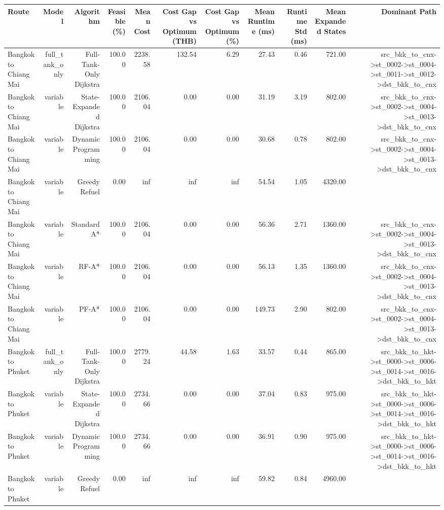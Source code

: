 \begin{tabular}{lrrrrrrrrrr}
\hline
Route & Model & Algorithm & Feasible (\%) & Mean Cost & Cost Gap vs Optimum (THB) & Cost Gap vs Optimum (\%) & Mean Runtime (ms) & Runtime Std (ms) & Mean Expanded States & Dominant Path \\
\hline
Bangkok to Chiang Mai & full\_tank\_only & Full-Tank-Only Dijkstra & 100.00 & 2238.58 & 132.54 & 6.29 & 27.43 & 0.46 & 721.00 & src\_bkk\_to\_cnx->st\_0002->st\_0004->st\_0011->st\_0012->dst\_bkk\_to\_cnx \\
Bangkok to Chiang Mai & variable & State-Expanded Dijkstra & 100.00 & 2106.04 & 0.00 & 0.00 & 31.19 & 3.19 & 802.00 & src\_bkk\_to\_cnx->st\_0002->st\_0004->st\_0013->dst\_bkk\_to\_cnx \\
Bangkok to Chiang Mai & variable & Dynamic Programming & 100.00 & 2106.04 & 0.00 & 0.00 & 30.68 & 0.78 & 802.00 & src\_bkk\_to\_cnx->st\_0002->st\_0004->st\_0013->dst\_bkk\_to\_cnx \\
Bangkok to Chiang Mai & variable & Greedy Refuel & 0.00 & inf & inf & inf & 54.54 & 1.05 & 4320.00 &  \\
Bangkok to Chiang Mai & variable & Standard A* & 100.00 & 2106.04 & 0.00 & 0.00 & 56.36 & 2.71 & 1360.00 & src\_bkk\_to\_cnx->st\_0002->st\_0004->st\_0013->dst\_bkk\_to\_cnx \\
Bangkok to Chiang Mai & variable & RF-A* & 100.00 & 2106.04 & 0.00 & 0.00 & 56.13 & 1.35 & 1360.00 & src\_bkk\_to\_cnx->st\_0002->st\_0004->st\_0013->dst\_bkk\_to\_cnx \\
Bangkok to Chiang Mai & variable & PF-A* & 100.00 & 2106.04 & 0.00 & 0.00 & 149.73 & 2.90 & 802.00 & src\_bkk\_to\_cnx->st\_0002->st\_0004->st\_0013->dst\_bkk\_to\_cnx \\
Bangkok to Phuket & full\_tank\_only & Full-Tank-Only Dijkstra & 100.00 & 2779.24 & 44.58 & 1.63 & 33.57 & 0.44 & 865.00 & src\_bkk\_to\_hkt->st\_0000->st\_0006->st\_0014->st\_0016->dst\_bkk\_to\_hkt \\
Bangkok to Phuket & variable & State-Expanded Dijkstra & 100.00 & 2734.66 & 0.00 & 0.00 & 37.04 & 0.83 & 975.00 & src\_bkk\_to\_hkt->st\_0000->st\_0006->st\_0014->st\_0016->dst\_bkk\_to\_hkt \\
Bangkok to Phuket & variable & Dynamic Programming & 100.00 & 2734.66 & 0.00 & 0.00 & 36.91 & 0.90 & 975.00 & src\_bkk\_to\_hkt->st\_0000->st\_0006->st\_0014->st\_0016->dst\_bkk\_to\_hkt \\
Bangkok to Phuket & variable & Greedy Refuel & 0.00 & inf & inf & inf & 59.82 & 0.84 & 4960.00 &  \\

\end{tabular}

